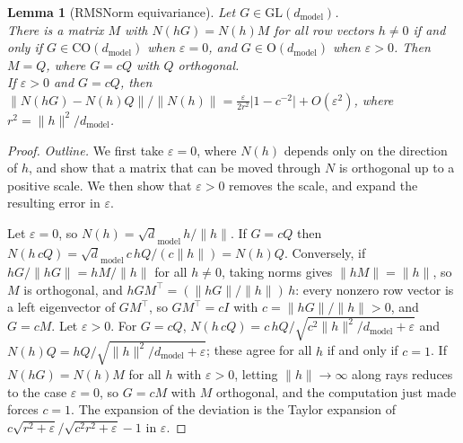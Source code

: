 \documentclass[10pt]{article}
\newtheorem{lemma}[theorem]{Lemma}
\theoremstyle{definition}
\theoremstyle{remark}
\newcommand{\dm}{d_{\mathrm{model}}}
\newcommand{\GL}{\mathrm{GL}}
\newcommand{\Ort}{\mathrm{O}}
\newcommand{\CO}{\mathrm{CO}}
\newcommand{\norm}[1]{\lVert #1\rVert}
\newcommand{\ptlabel}[1]{\phantomsection\label{#1}}
\newcommand{\stpart}[3]{\ifx\relax#1\relax\else\ptlabel{#1:#2}\fi{\upshape\bfseries\boldmath(#2)\ifx\relax#3\relax\else\ #3.\fi}}
\begin{document}
\begin{lemma}[RMSNorm equivariance]\label{lem:rms}
Let $G \in \GL(\dm)$.\\
\stpart{}{i}{} There is a matrix $M$ with $N(hG) = N(h)M$ for all row vectors $h \neq 0$ if and only if $G \in \CO(\dm)$ when $\varepsilon = 0$, and $G \in \Ort(\dm)$ when $\varepsilon > 0$. Then $M = Q$, where $G = cQ$ with $Q$ orthogonal.\\
\stpart{}{ii}{} If $\varepsilon > 0$ and $G = cQ$, then $\norm{N(hG) - N(h)Q}/\norm{N(h)} = \tfrac{\varepsilon}{2r^2}\lvert 1 - c^{-2}\rvert + O(\varepsilon^2)$, where $r^2 = \norm{h}^2/\dm$.
\end{lemma}
\begin{proof}
\emph{Outline.} We first take $\varepsilon = 0$, where $N(h)$ depends only on the direction of $h$, and show that a matrix that can be moved through $N$ is orthogonal up to a positive scale. We then show that $\varepsilon > 0$ removes the scale, and expand the resulting error in $\varepsilon$.

Let $\varepsilon = 0$, so $N(h) = \sqrt \dm\,h/\norm{h}$. If $G = cQ$ then $N(h\,cQ) = \sqrt \dm\,c\,hQ/(c\norm{h}) = N(h)Q$. Conversely, if $hG/\norm{hG} = hM/\norm{h}$ for all $h \neq 0$, taking norms gives $\norm{hM} = \norm{h}$, so $M$ is orthogonal, and $hGM^\top = (\norm{hG}/\norm{h})\,h$: every nonzero row vector is a left eigenvector of $GM^\top$, so $GM^\top = cI$ with $c = \norm{hG}/\norm{h} > 0$, and $G = cM$. Let $\varepsilon > 0$. For $G = cQ$, $N(h\,cQ) = c\,hQ/\sqrt{c^2\norm{h}^2/\dm + \varepsilon}$ and $N(h)Q = hQ/\sqrt{\norm{h}^2/\dm + \varepsilon}$; these agree for all $h$ if and only if $c = 1$. If $N(hG) = N(h)M$ for all $h$ with $\varepsilon > 0$, letting $\norm{h} \to \infty$ along rays reduces to the case $\varepsilon = 0$, so $G = cM$ with $M$ orthogonal, and the computation just made forces $c = 1$. The expansion of the deviation is the Taylor expansion of $c\sqrt{r^2+\varepsilon}/\sqrt{c^2r^2 + \varepsilon} - 1$ in $\varepsilon$.
\end{proof}
\end{document}
